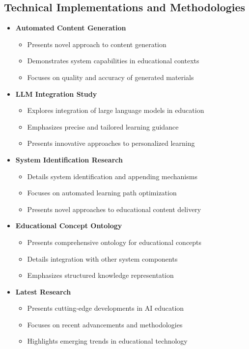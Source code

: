 \subsection{Technical Implementations and Methodologies}
\begin{itemize}
    \item \textbf{Automated Content Generation} \cite{arxiv2403}
        \begin{itemize}
            \item Presents novel approach to content generation
            \item Demonstrates system capabilities in educational contexts
            \item Focuses on quality and accuracy of generated materials
        \end{itemize}
    
    \item \textbf{LLM Integration Study} \cite{arxiv2405}
        \begin{itemize}
            \item Explores integration of large language models in education
            \item Emphasizes precise and tailored learning guidance
            \item Presents innovative approaches to personalized learning
        \end{itemize}
    
    \item \textbf{System Identification Research} \cite{arxiv2412}
        \begin{itemize}
            \item Details system identification and appending mechanisms
            \item Focuses on automated learning path optimization
            \item Presents novel approaches to educational content delivery
        \end{itemize}
    
    \item \textbf{Educational Concept Ontology} \cite{arxiv2407}
        \begin{itemize}
            \item Presents comprehensive ontology for educational concepts
            \item Details integration with other system components
            \item Emphasizes structured knowledge representation
        \end{itemize}
    
    \item \textbf{Latest Research} \cite{arxiv2502}
        \begin{itemize}
            \item Presents cutting-edge developments in AI education
            \item Focuses on recent advancements and methodologies
            \item Highlights emerging trends in educational technology
        \end{itemize}
\end{itemize}

